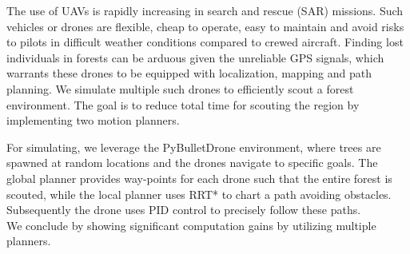 The use of UAVs is rapidly increasing\cite{doi:10.1126/scirobotics.abg1188} in search and rescue (SAR) missions\cite{6290694,doi:10.1080/19475705.2016.1238852}. Such vehicles or drones are flexible, cheap to operate, easy to maintain and avoid risks to pilots in difficult weather conditions compared to crewed aircraft. Finding lost individuals in forests can be arduous given the unreliable GPS signals, which warrants these drones to be equipped with localization, mapping and path planning.
We simulate multiple such drones to efficiently scout a forest environment. The goal is to reduce total time for scouting the region by implementing two motion planners.

For simulating, we leverage the PyBulletDrone\cite{panerati2021learning} environment, where trees are spawned at random locations and the drones navigate to specific goals. The global planner provides way-points for each drone such that the entire forest is scouted, while the local planner uses RRT* to chart a path avoiding obstacles. Subsequently the drone uses PID control to precisely follow these paths.\\

We conclude by showing significant computation gains by utilizing multiple planners.
